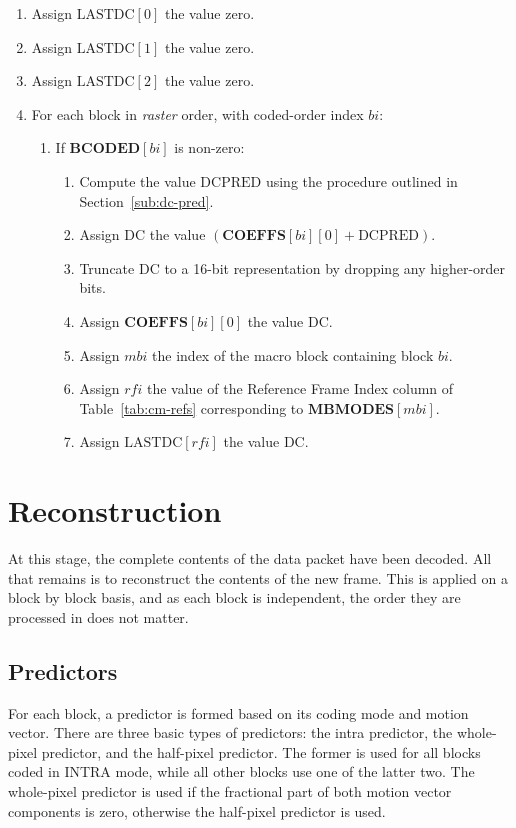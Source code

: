 \documentclass[9pt,letterpaper]{book}
\newcommand{\idx}[1]{{\ensuremath{\mathit{#1}}}}
\newcommand{\bi}{\idx{bi}}
\newcommand{\mbi}{\idx{mbi}}
\newcommand{\rfi}{\idx{rfi}}
\newcommand{\bitvar}[1]{\ensuremath{\mathbf{\bm{#1}}}}
\newcommand{\locvar}[1]{\ensuremath{\mathrm{#1}}}
\numberwithin{equation}{chapter}
\numberwithin{figure}{chapter}
\numberwithin{table}{chapter}
\begin{document}
\begin{enumerate}
\item
Assign $\locvar{LASTDC}[0]$ the value zero.
\item
Assign $\locvar{LASTDC}[1]$ the value zero.
\item
Assign $\locvar{LASTDC}[2]$ the value zero.
\item
For each block in {\em raster} order, with coded-order index \locvar{\bi}:
\begin{enumerate}
\item
If $\bitvar{BCODED}[\locvar{\bi}]$ is non-zero:
\begin{enumerate}
\item
Compute the value \locvar{DCPRED} using the procedure outlined in
 Section~\ref{sub:dc-pred}.
\item
Assign \locvar{DC} the value
 $(\bitvar{COEFFS}[\locvar{\bi}][0]+\locvar{DCPRED})$.
\item
Truncate \locvar{DC} to a 16-bit representation by dropping any higher-order
 bits.
\item
Assign $\bitvar{COEFFS}[\locvar{\bi}][0]$ the value \locvar{DC}.
\item
Assign \locvar{\mbi} the index of the macro block containing block
 \locvar{\bi}.
\item
Assign \locvar{\rfi} the value of the Reference Frame Index column of
 Table~\ref{tab:cm-refs} corresponding to $\bitvar{MBMODES}[\locvar{\mbi}]$.
\item
Assign $\locvar{LASTDC}[\rfi]$ the value $\locvar{DC}$.
\end{enumerate}
\end{enumerate}
\end{enumerate}

\section{Reconstruction}

At this stage, the complete contents of the data packet have been decoded.
All that remains is to reconstruct the contents of the new frame.
This is applied on a block by block basis, and as each block is independent,
 the order they are processed in does not matter.

\subsection{Predictors}
\label{sec:predictors}

For each block, a predictor is formed based on its coding mode and motion
 vector.
There are three basic types of predictors: the intra predictor, the whole-pixel
 predictor, and the half-pixel predictor.
The former is used for all blocks coded in INTRA mode, while all other blocks
 use one of the latter two.
The whole-pixel predictor is used if the fractional part of both motion vector
 components is zero, otherwise the half-pixel predictor is used.
\end{document}
